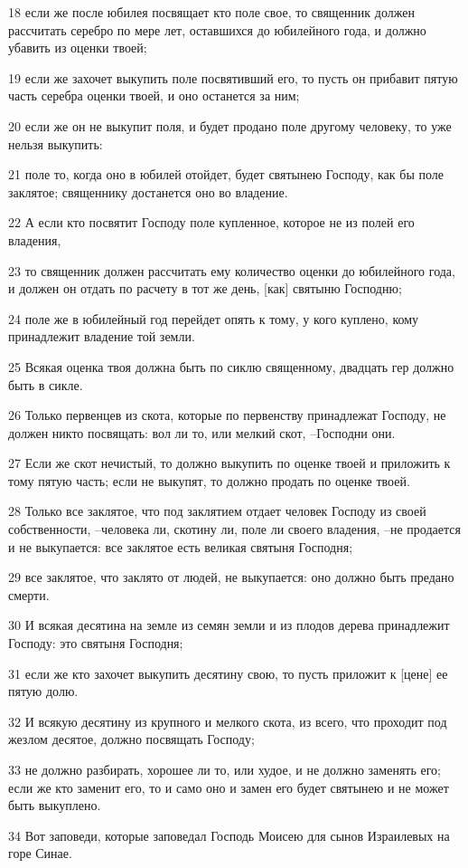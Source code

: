 \par 18 если же после юбилея посвящает кто поле свое, то священник должен рассчитать серебро по мере лет, оставшихся до юбилейного года, и должно убавить из оценки твоей;
\par 19 если же захочет выкупить поле посвятивший его, то пусть он прибавит пятую часть серебра оценки твоей, и оно останется за ним;
\par 20 если же он не выкупит поля, и будет продано поле другому человеку, то уже нельзя выкупить:
\par 21 поле то, когда оно в юбилей отойдет, будет святынею Господу, как бы поле заклятое; священнику достанется оно во владение.
\par 22 А если кто посвятит Господу поле купленное, которое не из полей его владения,
\par 23 то священник должен рассчитать ему количество оценки до юбилейного года, и должен он отдать по расчету в тот же день, [как] святыню Господню;
\par 24 поле же в юбилейный год перейдет опять к тому, у кого куплено, кому принадлежит владение той земли.
\par 25 Всякая оценка твоя должна быть по сиклю священному, двадцать гер должно быть в сикле.
\par 26 Только первенцев из скота, которые по первенству принадлежат Господу, не должен никто посвящать: вол ли то, или мелкий скот, --Господни они.
\par 27 Если же скот нечистый, то должно выкупить по оценке твоей и приложить к тому пятую часть; если не выкупят, то должно продать по оценке твоей.
\par 28 Только все заклятое, что под заклятием отдает человек Господу из своей собственности, --человека ли, скотину ли, поле ли своего владения, --не продается и не выкупается: все заклятое есть великая святыня Господня;
\par 29 все заклятое, что заклято от людей, не выкупается: оно должно быть предано смерти.
\par 30 И всякая десятина на земле из семян земли и из плодов дерева принадлежит Господу: это святыня Господня;
\par 31 если же кто захочет выкупить десятину свою, то пусть приложит к [цене] ее пятую долю.
\par 32 И всякую десятину из крупного и мелкого скота, из всего, что проходит под жезлом десятое, должно посвящать Господу;
\par 33 не должно разбирать, хорошее ли то, или худое, и не должно заменять его; если же кто заменит его, то и само оно и замен его будет святынею и не может быть выкуплено.
\par 34 Вот заповеди, которые заповедал Господь Моисею для сынов Израилевых на горе Синае.


